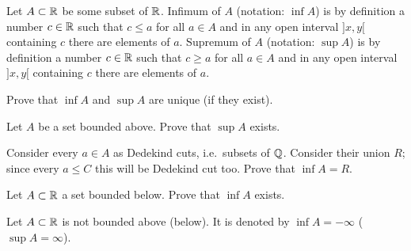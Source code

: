 \documentclass[12pt]{article}
\begin{document}
\begin{opredelenie} Let $A\subset {\mathbb R}$ be some subset of 
${\mathbb R}$. Infimum of $A$ (notation: $\inf A$) is by definition a number $c
\in {\mathbb R}$ such that $c \leq a$ for all $a\in A$ and in any open interval
$]x, y[$ containing $c$ there are elements of $a$. Supremum of $A$
(notation: $\sup A$) is by definition a number $c \in {\mathbb R}$ such that $c
\geq a$ for all $a\in A$ and in any open interval $]x, y[$ containing
$c$ there are elements of $a$.
\end{opredelenie}

\begin{zadacha} Prove that $\inf A$ and $\sup A$ are unique (if they
  exist).
\end{zadacha}

\begin{zadacha}[!] Let $A$ be a set bounded above. Prove that $\sup A$
 exists.
\end{zadacha}

\begin{ukazanie} Consider every $a\in A$ as Dedekind cuts,
i.e.\ subsets of ${\mathbb Q}$. Consider their union $R$; since every $a \leq C$
this will be Dedekind cut too. Prove that $\inf A = R$.
\end{ukazanie}

\begin{zadacha}[!] Let $A \subset {\mathbb R}$ a set bounded below.
Prove that $\inf A$ exists.
\end{zadacha}

\begin{zamechanie} Let $A\subset {\mathbb R}$ is not bounded above (below).
It is denoted by $\inf A = -\infty$ ($\sup A = \infty$).
\end{zamechanie}
\end{document}
